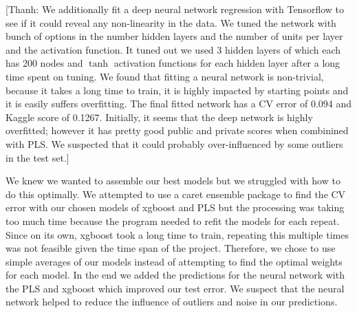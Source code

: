 \documentclass[12pt]{article}
\newcommand{\thanh}[1]{{\color{blue} [Thanh: #1]}}
\begin{document}

\thanh{We additionally fit a deep neural network regression with Tensorflow to see if it could reveal any non-linearity in the data. We tuned the network with bunch of options in the number hidden layers and the number of units per layer and the activation function. It tuned out we used 3 hidden layers of which each has 200 nodes and $\tanh$ activation functions for each hidden layer after a long time spent on tuning. We found that fitting a neural network is non-trivial, because it takes a long time to train, it is highly impacted by starting points and it is easily suffers overfitting. The final fitted network has a CV error of 0.094 and Kaggle score of 0.1267. Initially, it seems that the deep network is highly overfitted; however it has pretty good public and private scores when combinined with PLS. We suspected that it could probably over-influenced by some outliers in the test set.} 

We knew we wanted to assemble our best models but we struggled with how to do this optimally.  We attempted to use a caret ensemble package to find the CV error with our chosen models of xgboost and PLS but the processing was taking too much time because the program needed to refit the models for each repeat.  Since on its own, xgboost took a long time to train, repeating this multiple times was not feasible given the time span of the project.  Therefore, we chose to use simple averages of our models instead of attempting to find the optimal weights for each model.  In the end we added the predictions for the neural network with the PLS and xgboost which improved our test error.  We suspect that the neural network helped to reduce the influence of outliers and noise in our predictions.
\end{document}
